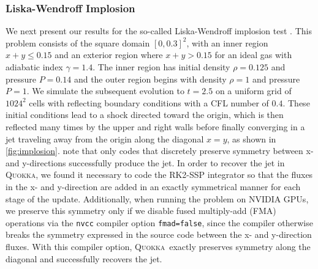 \documentclass[fleqn,usenatbib]{mnras}
\newcommand{\quokka}{\textsc{Quokka}}
\begin{document}
\subsubsection{Liska-Wendroff Implosion}
We next present our results for the so-called Liska-Wendroff implosion test \citep{Hui_1999,Liska_2003}. This problem consists of the square domain $[0, 0.3]^2$, with an inner region $x+y \leq 0.15$ and an exterior region where $x + y > 0.15$ for an ideal gas with adiabatic index $\gamma = 1.4$. The inner region has initial density $\rho = 0.125$ and pressure $P = 0.14$ and the outer region begins with density $\rho = 1$ and pressure $P = 1$. We simulate the subsequent evolution to $t=2.5$ on a uniform grid of $1024^2$ cells with reflecting boundary conditions with a CFL number of $0.4$. These initial conditions lead to a shock directed toward the origin, which is then reflected many times by the upper and right walls before finally converging in a jet traveling away from the origin along the diagonal $x=y$, as shown in \autoref{fig:implosion}. \cite{Liska_2003} note that only codes that discretely preserve symmetry between x- and y-directions successfully produce the jet. In order to recover the jet in \quokka, we found it necessary to code the RK2-SSP integrator so that the fluxes in the x- and y-direction are added in an exactly symmetrical manner for each stage of the update. Additionally, when running the problem on NVIDIA GPUs, we preserve this symmetry only if we disable fused multiply-add (FMA) operations via the \texttt{nvcc} compiler option \texttt{fmad=false}, since the compiler otherwise breaks the symmetry expressed in the source code between the x- and y-direction fluxes. With this compiler option, \quokka~exactly preserves symmetry along the diagonal and successfully recovers the jet.
\end{document}
